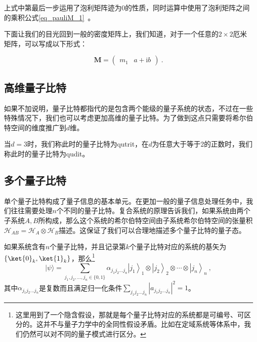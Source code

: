 上式中第最后一步运用了泡利矩阵迹为$0$的性质，同时运算中使用了泡利矩阵之间的乘积公式\autoref{eq_pauliM_1}~。

下面让我们的目光回到一般的密度矩阵上，我们知道，对于一个任意的$2\times 2$厄米矩阵，可以写成以下形式：

\begin{equation}
\mathbf{M} = \begin{pmatrix}
    m_1 & a + \mathrm{i}b
    \end{pmatrix}~.
\end{equation}







\subsection{高维量子比特}

如果不加说明，量子比特都指代的是包含两个能级的量子系统的状态，不过在一些特殊情况下，我们也可以考虑更加高维的量子比特。为了做到这点只需要将希尔伯特空间的维度推广到$d$维。

当$d=3$时，我们称此时的量子比特为qutrit，在$d$为任意大于等于2的正数时，我们称此时的量子比特为qudit。

\subsection{多个量子比特}


单个量子比特构成了量子信息的基本单元。在更加一般的量子信息处理任务中，我们往往需要处理$n$个不同的量子比特。复合系统的原理告诉我们，如果系统由两个子系统$A,B$所构成，那么这个系统的希尔伯特空间由子系统希尔伯特空间的张量积$\mathcal{H}_{AB}=\mathcal{H}_A\otimes\mathcal{H}_B$描述。这保证了我们可以合理地描述多个量子比特的量子态。

如果系统含有$n$个量子比特，并且记录第$k$个量子比特对应的系统的基矢为$\{\ket{0}_k,\ket{1}_k\}$，那么\footnote{这里用到了一个隐含假设，那就是每个量子比特对应的系统都是可编号、可区分的。这并不与量子力学中的全同性假设矛盾。比如在定域系统等体系中，我们仍然可以对不同的量子模式进行区分。}$$
|\psi\rangle=\sum_{j_1, j_2, \ldots, j_n \in\{0,1\}} \alpha_{j_1 j_2 \ldots j_n}\left|j_1\right\rangle_1 \otimes\left|j_2\right\rangle_2 \otimes \cdots \otimes\left|j_n\right\rangle_n~,
$$其中$\alpha_{j_1j_2\ldots j_n}$是复数而且满足归一化条件$\sum_{j_1j_2\ldots j_n}|a_{j_1j_2\ldots j_n}|^2=1$。

